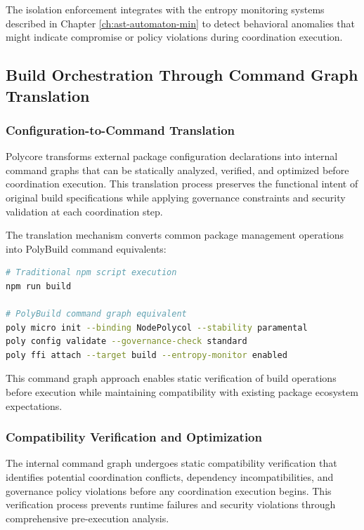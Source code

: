 The isolation enforcement integrates with the entropy monitoring systems described in Chapter \ref{ch:ast-automaton-min} to detect behavioral anomalies that might indicate compromise or policy violations during coordination execution.

\subsection{Build Orchestration Through Command Graph Translation}

\subsubsection{Configuration-to-Command Translation}

Polycore transforms external package configuration declarations into internal command graphs that can be statically analyzed, verified, and optimized before coordination execution. This translation process preserves the functional intent of original build specifications while applying governance constraints and security validation at each coordination step.

The translation mechanism converts common package management operations into PolyBuild command equivalents:

\begin{lstlisting}[style=riftlang, language=bash]
# Traditional npm script execution
npm run build

# PolyBuild command graph equivalent
poly micro init --binding NodePolycol --stability paramental
poly config validate --governance-check standard
poly ffi attach --target build --entropy-monitor enabled
\end{lstlisting}

This command graph approach enables static verification of build operations before execution while maintaining compatibility with existing package ecosystem expectations.

\subsubsection{Compatibility Verification and Optimization}

The internal command graph undergoes static compatibility verification that identifies potential coordination conflicts, dependency incompatibilities, and governance policy violations before any coordination execution begins. This verification process prevents runtime failures and security violations through comprehensive pre-execution analysis.

